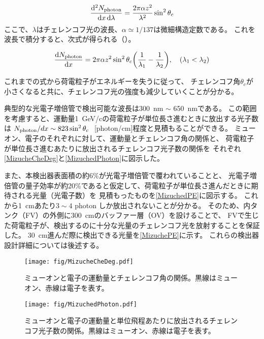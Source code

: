 \begin{equation}
\frac{\dd[2]{N_{\mathrm{photon}}}}{\dd{x} \dd{\lambda}} = \frac{2 \pi \alpha z^{2}}{\lambda^{2}} \sin^{2} \theta_{c}
\label{dNdXdL}
\end{equation}
ここで、$\lambda$はチェレンコフ光の波長、$\alpha \simeq 1/137$は微細構造定数である。
これを波長で積分すると、次式が得られる（）。

\begin{equation}
  \dv{N_{\photon}}{x} =  2 \pi \alpha z^{2} \sin^{2} \theta_{c} \pqty{ \frac{1}{\lambda_{1}}-\frac{1}{\lambda_{2}} }  \qcomma \pqty{\lambda_{1} < \lambda_{2}}
\label{dNdX}
\end{equation}

これまでの式から荷電粒子がエネルギーを失うに従って、
チェレンコフ角$\theta_{c}$が小さくなると共に、チェレンコフ光の強度も減少していくことが分かる。

典型的な光電子増倍管で検出可能な波長は\qty{300}{\nm} $\sim$ \qty{650}{\nm}である。
この範囲を考慮すると、運動量\qty{1}{\GeV/c}の荷電粒子が単位長さ進むときに放出する光子数は
$N_{\photon}/dx \sim 823\sin^{2}\theta_{c}\ $ [photon/cm]程度と見積もることができる。
ミューオン、電子のそれぞれに対して、運動量とチェレンコフ角の関係と、
荷電粒子が単位長さ進むあたりに放出されるチェレンコフ光子数の関係を
それぞれ\autoref{MizucheCheDeg}と\autoref{MizuchedPhoton}に図示した。

また、本検出器表面積の約6\%が光電子増倍管で覆われていることと、
光電子増倍管の量子効率が約20\%であると仮定して、荷電粒子が単位長さ進んだときに期待される光量（光電子数）を
見積もったものを\autoref{MizuchedPE}に図示する。
これから\qty{1}{\cm}あたり$3\sim4$ photon しか放出されないことが分かる。
そのため、内タンク（FV）の外側に\qty{300}{\cm}のバッファー層（OV）を設けることで、
FVで生じた荷電粒子が、検出するのに十分な光量のチェレンコフ光を放射することを保証した。
\qty{30}{\cm}進んだ際に検出できる光量を\autoref{MizuchePE}に示す。
これらの検出器設計詳細については後述する。

\begin{figure}[htbp]
  \begin{minipage}{0.47\textwidth}
    \centering
    \texttt{[image: fig/MizucheCheDeg.pdf]}
    \caption[ミューオンと電子の運動量とチェレンコフ角の関係]{ミューオンと電子の運動量とチェレンコフ角の関係。黒線はミューオン、赤線は電子を表す。}
    \label{MizucheCheDeg}
  \end{minipage}
  \hfill
  \begin{minipage}{0.47\textwidth}
    \centering
    \texttt{[image: fig/MizuchedPhoton.pdf]}
    \caption[ミューオンと電子の運動量と単位飛程あたりに放出されるチェレンコフ光子数の関係]{ミューオンと電子の運動量と単位飛程あたりに放出されるチェレンコフ光子数の関係。黒線はミューオン、赤線は電子を表す。}
    \label{MizuchedPhoton}
  \end{minipage}
\end{figure}

